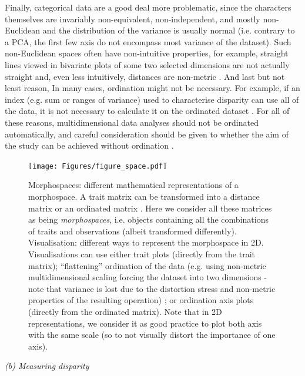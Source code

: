 \documentclass[12pt,letterpaper]{article}
\renewcommand{\subsection}[1]{%
\bigskip
\begin{center}
\begin{large}
\normalfont\itshape #1
\end{large}
\end{center}}
\begin{document}
Finally, categorical data are a good deal more problematic, since the characters themselves are invariably non-equivalent, non-independent, and mostly non-Euclidean and the distribution of the variance is usually normal (i.e. contrary to a PCA, the first few axis do not encompass most variance of the dataset).
Such non-Euclidean spaces often have non-intuitive properties, for example, straight lines viewed in bivariate plots of some two selected dimensions are not actually straight and, even less intuitively, distances are non-metric \citep[i.e. the distance between A and B is not equal to the distance between B and A][]{Gerber2014-ol}.
And last but not least reason, In many cases, ordination might not be necessary.
For example, if an index (e.g. sum or ranges of variance) used to characterise disparity can use all of the data, it is not necessary to calculate it on the ordinated dataset \citep{Close2015-qi}.
For all of these reasons, multidimensional data analyses should not be ordinated automatically, and careful consideration should be given to whether the aim of the study can be achieved without ordination \citep{lloyd2016,lloyd2018}.


\begin{figure}[!htbp]
\centering
   \texttt{[image: Figures/figure\_space.pdf]}
\caption{
    \tiny{
    Morphospaces: different mathematical representations of a morphospace.
    A trait matrix can be transformed into a distance matrix \citep[e.g in][]{Close2015-qi} or an ordinated matrix \citep[e.g. in][]{Brusatte2008-vx}.
    Here we consider all these matrices as being \textit{morphospaces}, i.e. objects containing all the combinations of traits and observations (albeit transformed differently).
    Visualisation: different  ways to represent the morphospace in 2D.
    Visualisations can use either trait plots (directly from the trait matrix); ``flattening'' ordination of the data (e.g. using non-metric multidimensional scaling forcing the dataset into two dimensions - note that variance is lost due to the distortion stress and non-metric properties of the resulting operation) ; or ordination axis plots (directly from the ordinated matrix).
    Note that in 2D representations, we consider it as good practice to plot both axis with the same scale (so to not visually distort the importance of one axis).
    }
}
\label{Fig:morphospace}
\end{figure}

\subsection{(b) Measuring disparity}
\label{section:metrics}
\end{document}
